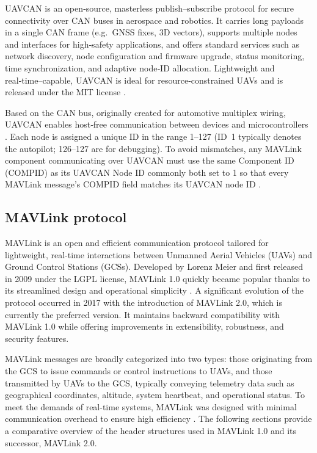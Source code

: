 UAVCAN is an open‑source, masterless publish–subscribe protocol for secure connectivity over CAN buses in aerospace and robotics.  It carries long payloads in a single CAN frame (e.g.\ GNSS fixes, 3D vectors), supports multiple nodes and interfaces for high‑safety applications, and offers standard services such as network discovery, node configuration and firmware upgrade, status monitoring, time synchronization, and adaptive node‑ID allocation.  Lightweight and real‑time–capable, UAVCAN is ideal for resource‑constrained UAVs and is released under the MIT license \cite{kriz2015uranuslink}.

\vspace{0.5cm}

Based on the CAN bus, originally created for automotive multiplex wiring, UAVCAN enables host‑free communication between devices and microcontrollers \cite{kriz2015uranuslink}.  Each node is assigned a unique ID in the range 1–127 (ID 1 typically denotes the autopilot; 126–127 are for debugging).  To avoid mismatches, any MAVLink component communicating over UAVCAN must use the same Component ID (COMPID) as its UAVCAN Node ID commonly both set to 1 so that every MAVLink message’s COMPID field matches its UAVCAN node ID \cite{kriz2015uranuslink}.




\subsection{MAVLink protocol}


MAVLink is an open and efficient communication protocol tailored for lightweight, real-time interactions between Unmanned Aerial Vehicles (UAVs) and Ground Control Stations (GCSs). Developed by Lorenz Meier and first released in 2009 under the LGPL license, MAVLink 1.0 quickly became popular thanks to its streamlined design and operational simplicity \cite{allouch2019mavsec, koubaa2017mavlink}. A significant evolution of the protocol occurred in 2017 with the introduction of MAVLink 2.0, which is currently the preferred version. It maintains backward compatibility with MAVLink 1.0 while offering improvements in extensibility, robustness, and security features.

\vspace{0.5cm}

MAVLink messages are broadly categorized into two types: those originating from the GCS to issue commands or control instructions to UAVs, and those transmitted by UAVs to the GCS, typically conveying telemetry data such as geographical coordinates, altitude, system heartbeat, and operational status. To meet the demands of real-time systems, MAVLink was designed with minimal communication overhead to ensure high efficiency \cite{allouch2019mavsec}. The following sections provide a comparative overview of the header structures used in MAVLink 1.0 and its successor, MAVLink 2.0.




